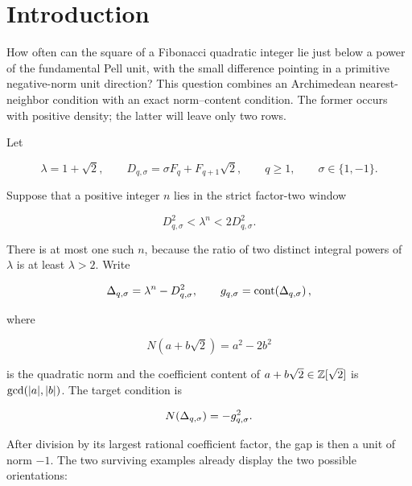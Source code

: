 %
%
\section{Introduction}
\label{sec:introduction}

How often can the square of a Fibonacci quadratic integer lie just below a
power of the fundamental Pell unit, with the small difference pointing in a
primitive negative-norm unit direction? This question combines an
Archimedean nearest-neighbor condition with an exact norm--content condition.
The former occurs with positive density; the latter will leave only two
rows.

Let

\begin{equation}
 \lambda=1+\sqrt2,
 \qquad
 D_{q,\sigma}=\sigma F_q+F_{q+1}\sqrt2,
 \qquad
 q\geqslant1,
 \qquad
 \sigma\in\{1,-1\}.
 \label{eq:intro-D}
\end{equation}

Suppose that a positive integer $n$ lies in the strict factor-two window

\begin{equation}
 D_{q,\sigma}^2<\lambda^n<2D_{q,\sigma}^2.
 \label{eq:intro-window}
\end{equation}

There is at most one such $n$, because the ratio of two distinct integral
powers of $\lambda$ is at least $\lambda>2$. Write

\begin{equation}
 \Delta_{q,\sigma}=\lambda^n-D_{q,\sigma}^2,
 \qquad
 g_{q,\sigma}=\operatorname{cont}\!\left(\Delta_{q,\sigma}\right),
 \label{eq:intro-gap}
\end{equation}

where

\[
 N(a+b\sqrt2)=a^2-2b^2
\]

is the quadratic norm and the coefficient content of
$a+b\sqrt2\in\mathbb{Z}[\sqrt2]$ is $\gcd(\lvert a\rvert,\lvert b\rvert)$. The target condition is

\begin{equation}
 N\!\left(\Delta_{q,\sigma}\right)=-g_{q,\sigma}^2.
 \label{eq:intro-target}
\end{equation}

After division by its largest rational coefficient factor, the gap is then
a unit of norm $-1$. The two surviving examples already display the two possible
orientations:

